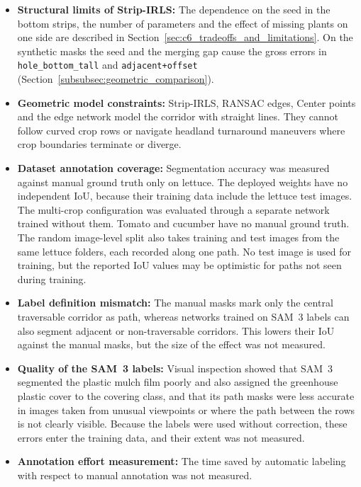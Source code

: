 \begin{itemize}
\item \textbf{Structural limits of Strip-IRLS:} The dependence on the seed in the bottom strips, the number of parameters and the effect of missing plants on one side are described in Section~\ref{sec:c6_tradeoffs_and_limitations}. On the synthetic masks the seed and the merging gap cause the gross errors in \texttt{hole\_bottom\_tall} and \texttt{adjacent+offset} (Section~\ref{subsubsec:geometric_comparison}).

\item \textbf{Geometric model constraints:} Strip-IRLS, RANSAC edges, Center points and the edge network model the corridor with straight lines. They cannot follow curved crop rows or navigate headland turnaround maneuvers where crop boundaries terminate or diverge.

\item \textbf{Dataset annotation coverage:} Segmentation accuracy was measured against manual ground truth only on lettuce. The deployed weights have no independent IoU, because their training data include the lettuce test images. The multi-crop configuration was evaluated through a separate network trained without them. Tomato and cucumber have no manual ground truth. The random image-level split also takes training and test images from the same lettuce folders, each recorded along one path. No test image is used for training, but the reported IoU values may be optimistic for paths not seen during training.

\item \textbf{Label definition mismatch:} The manual masks mark only the central traversable corridor as path, whereas networks trained on SAM~3 labels can also segment adjacent or non-traversable corridors. This lowers their IoU against the manual masks, but the size of the effect was not measured.

\item \textbf{Quality of the SAM~3 labels:} Visual inspection showed that SAM~3 segmented the plastic mulch film poorly and also assigned the greenhouse plastic cover to the covering class, and that its path masks were less accurate in images taken from unusual viewpoints or where the path between the rows is not clearly visible. Because the labels were used without correction, these errors enter the training data, and their extent was not measured.

\item \textbf{Annotation effort measurement:} The time saved by automatic labeling with respect to manual annotation was not measured.


\end{itemize}
